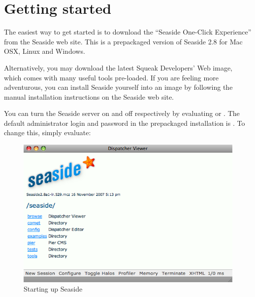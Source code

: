 \documentclass[a4paper,10pt,twoside]{book}
\begin{document}
\section{Getting started}

The easiest way to get started is to download the ``Seaside One-Click Experience'' from the Seaside web site\cite{Seaside}.
This is a prepackaged version of Seaside 2.8 for Mac OSX, Linux and Windows.

Alternatively, you may download the latest Squeak Developers' Web image\cite{SqueakDevImage}, which comes with many useful tools pre-loaded.
If you are feeling more adventurous, you can install Seaside yourself into an image by following the manual installation instructions on the Seaside web site.

You can turn the Seaside server on and off respectively by evaluating
or
.
The default administrator login and password in the prepackaged installation is .
To change this, simply evaluate: 

\begin{figure}[ht]
\begin{center}
\includegraphics[width=\textwidth]{seasideStartup}
\caption{Starting up Seaside}
\label{fig:seasideStartup}
\end{center}
\end{figure}

\end{document}
